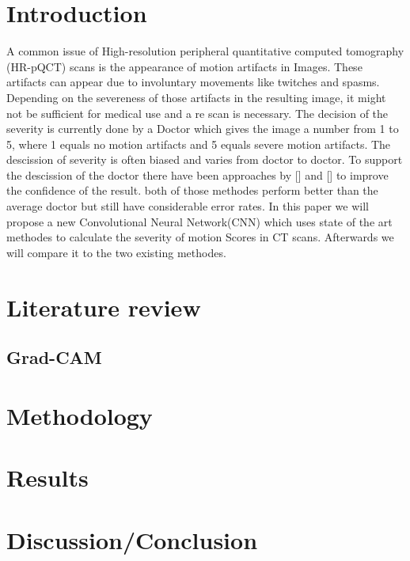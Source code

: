 \documentclass[acmsmall, review]{acmart}
\begin{document}
\section{Introduction}
	A common issue of High-resolution peripheral quantitative computed tomography (HR-pQCT) scans is the appearance of motion artifacts in Images. These artifacts can appear due to involuntary movements like twitches and spasms. Depending on the severeness of those artifacts in the resulting image, it might not be sufficient for medical use and a re scan is necessary. The decision of the severity is currently done by a Doctor which gives the image a number from 1 to 5, where 1 equals no motion artifacts and 5 equals severe motion artifacts. The descission of severity is often biased and varies from doctor to doctor. To support the descission of the doctor there have been approaches by [] and []  to improve the confidence of the result. both of those methodes perform better than the average doctor but still have considerable error rates. In this paper we will propose a new Convolutional Neural Network(CNN) which uses state of the art methodes to calculate the severity of motion Scores in CT scans. Afterwards we will compare it to the two existing methodes.
	
\section{Literature review}
\subsection{Grad-CAM}

\section{Methodology}
\section{Results}
\section{Discussion/Conclusion}
\end{document}
